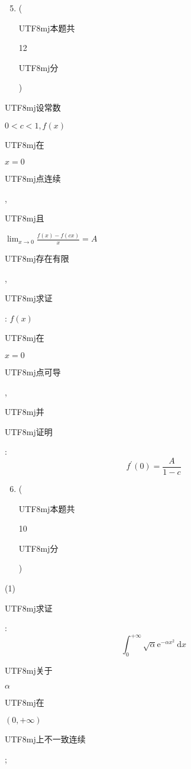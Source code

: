 \documentclass[10pt]{article}
\begin{document}
\begin{enumerate}
  \setcounter{enumi}{4}
  \item (\begin{CJK}{UTF8}{mj}本题共\end{CJK} 12 \begin{CJK}{UTF8}{mj}分\end{CJK})
\end{enumerate}
\begin{CJK}{UTF8}{mj}设常数\end{CJK} $0<c<1, f(x)$ \begin{CJK}{UTF8}{mj}在\end{CJK} $x=0$ \begin{CJK}{UTF8}{mj}点连续\end{CJK}, \begin{CJK}{UTF8}{mj}且\end{CJK} $\lim _{x \rightarrow 0} \frac{f(x)-f(c x)}{x}=A$ \begin{CJK}{UTF8}{mj}存在有限\end{CJK}, \begin{CJK}{UTF8}{mj}求证\end{CJK}: $f(x)$ \begin{CJK}{UTF8}{mj}在\end{CJK} $x=0$ \begin{CJK}{UTF8}{mj}点可导\end{CJK}, \begin{CJK}{UTF8}{mj}并\end{CJK} \begin{CJK}{UTF8}{mj}证明\end{CJK}:
$$
f^{\prime}(0)=\frac{A}{1-c}
$$

\begin{enumerate}
  \setcounter{enumi}{5}
  \item (\begin{CJK}{UTF8}{mj}本题共\end{CJK} 10 \begin{CJK}{UTF8}{mj}分\end{CJK})
\end{enumerate}
(1) \begin{CJK}{UTF8}{mj}求证\end{CJK}:
$$
\int_{0}^{+\infty} \sqrt{\alpha} \mathrm{e}^{-\alpha x^{2}} \mathrm{~d} x
$$
\begin{CJK}{UTF8}{mj}关于\end{CJK} $\alpha$ \begin{CJK}{UTF8}{mj}在\end{CJK} $(0,+\infty)$ \begin{CJK}{UTF8}{mj}上不一致连续\end{CJK};
\end{document}
